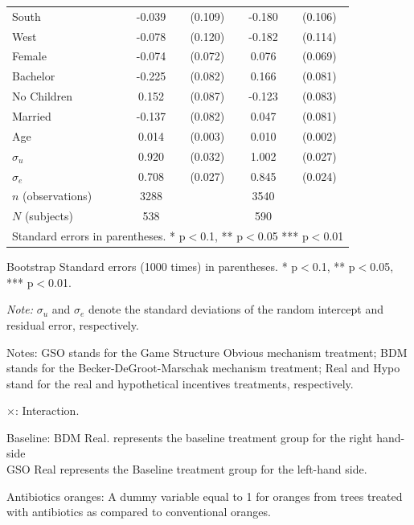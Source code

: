 \documentclass[12pt]{article}
\newcommand{\sym}[1]{\rlap{$^{#1}$}}
\begin{document}
\begin{table}[H]
{\begin{tabular}{l*{2}{cc}}
South       &      -0.039         &     (0.109)&	-0.180\sym{*}  &     (0.106)\\
West        &      -0.078         &     (0.120)&	-0.182         &     (0.114)\\
Female      &      -0.074         &     (0.072)&	0.076         &     (0.069)\\
Bachelor    &      -0.225\sym{***}&     (0.082)&	0.166\sym{**} &     (0.081)\\
No Children &       0.152\sym{*}  &     (0.087)&	-0.123         &     (0.083)\\
Married     &      -0.137\sym{*}  &     (0.082)&	0.047         &     (0.081)\\
Age         &       0.014\sym{***}&     (0.003)&	0.010\sym{***}&     (0.002)\\
$\sigma_u$     &       0.920\sym{***}&     (0.032)&	1.002\sym{***}&     (0.027)\\
$\sigma_e$   &       0.708\sym{***}&     (0.027)&	0.845\sym{***}&     (0.024)\\
\hline
\(n\) (observations)    &        3288         &            &        3540         &            \\
\(N\) (subjects)      &        538         &            &        590         &            \\
\hline \hline
\multicolumn{5}{l}{\footnotesize Standard errors in parentheses. * p$<$0.1, ** p$<$0.05 *** p$<$0.01}\\
\end{tabular}
}

\begin{tablenotes}
            \footnotesize
           \item Bootstrap Standard errors (1000 times) in parentheses. * p$<$0.1, ** p$<$0.05, *** p$<$0.01.
            \item \textit{Note:} $\sigma_u$ and $\sigma_e$ denote the standard deviations of the random intercept and residual error, respectively.
            \item Notes: GSO stands for the Game Structure Obvious mechanism treatment; BDM stands for the Becker-DeGroot-Marschak mechanism treatment; Real and Hypo stand for the real and hypothetical incentives treatments, respectively.
           \item $\times$: Interaction.
           \item Baseline: BDM Real. represents the baseline treatment group for the right hand-side \\
           GSO Real represents the Baseline treatment group for the left-hand side.
           \item Antibiotics oranges: A dummy variable equal to 1 for oranges from trees treated with antibiotics as compared to conventional oranges.
        \end{tablenotes}
\end{table}
\end{document}
